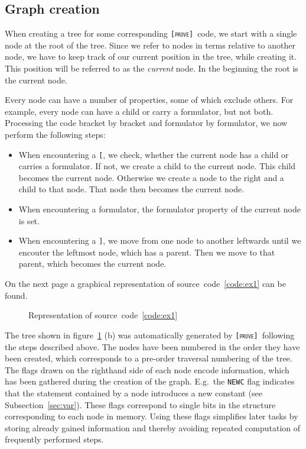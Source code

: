 \documentclass[british]{article}
\newcommand\prv{bc}
\newcommand\m[1]{\texttt{#1}}
\newcommand\name{\texttt{\textsc{[prove]}}}
\begin{document}
\subsection{Graph creation}\label{sec:creation}

When creating a tree for some corresponding \name\ code, we start with a single
node at the root of the tree. Since we refer to nodes in terms relative to
another node, we have to keep track of our current position in the tree, while
creating it. This position will be referred to as the \emph{current} node. In
the beginning the root is the current node.

Every node can have a number of properties, some of which exclude others. For
example, every node can have a child or carry a formulator, but not both. Processing
the code bracket by bracket and formulator by formulator, we now perform the following
steps:

\begin{itemize}
	\item 
		When encountering a \m{[}, we check, whether the current node has a
		child or carries a formulator. If not, we create a child to the current
		node. This child becomes the current node. Otherwise we create a
		node to the right and a child to that node. That node then becomes
		the current node.
	\item
		When encountering a formulator, the formulator property of the current node is
		set.
	\item
		When encountering a \m{]}, we move from one node to another leftwards
		until we encouter the leftmost node, which has a parent. Then we move to
		that parent, which becomes the current node.
\end{itemize}

On the next page a graphical representation of
source~code~\ref{code:ex1} can be found.
\pagebreak{}

\begin{figure}[!ht]
\caption{Representation of source~code~\ref{code:ex1}}\label{fig:ex1}
\centering
{}
\end{figure}

The tree shown in figure~\ref{fig:ex1} (b) was automatically generated by \name\
following the steps described above. The nodes have been numbered in the order
they have been created, which corresponds to a pre-order traversal numbering of
the tree. The flags drawn on the righthand side of each node encode information,
which has been gathered during the creation of the graph.  E.g.\ the
\texttt{NEWC} flag indicates that the statement contained by a node introduces a
new constant (see Subsection~\ref{sec:var}). These flags correspond to single bits in the
structure corresponding to each node in memory. Using these flags simplifies
later tasks by storing already gained information and thereby avoiding repeated
computation of frequently performed steps.\newline
\end{document}
